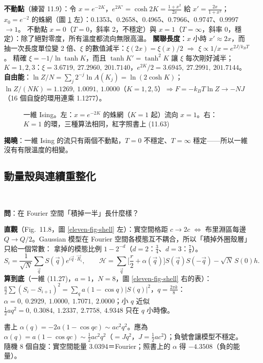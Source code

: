 \textbf{不動點}（練習 11.9）：令 $x=e^{-2K}$，$e^{2K'}=\cosh2K=\frac{1+x^2}{2x}$ 給 $x'=\frac{2x}{1+x^2}$；$x_0=e^{-2}$ 的蛛網（圖 \ref{eleven-fig-ising} 左）：0.1353、0.2658、0.4965、0.7966、0.9747、0.9997 $\to1$。
不動點 $x=0$（$T=0$，斜率 2，不穩定）與 $x=1$（$T=\infty$，斜率 0，穩定）：除了絕對零度，所有溫度都流向無限高溫。
\textbf{關聯長度}：$x$ 小時 $x'\approx2x$，而抽一次長度單位變 2 倍、$\xi$ 的數值減半：$\xi(2x)=\xi(x)/2$ $\Rightarrow$ $\xi\propto1/x=e^{2J/k_BT}$。
精確 $\xi=-1/\ln\tanh K$，而且 $\tanh K'=\tanh^2K$ 讓 $\xi$ 每次剛好減半；$K=1,2,3$：$\xi=3.6719,\ 27.2960,\ 201.7140$，$e^{2K}/2=3.6945,\ 27.2991,\ 201.7144$。
\textbf{自由能}：$\ln Z/N=\sum_j2^{-j}\ln A(K_j)=\ln(2\cosh K)$；$\ln Z/(NK)=1.1269,\ 1.0091,\ 1.0000$（$K=1,2,5$）$\Rightarrow F=-k_BT\ln Z\to-NJ$（16 個自旋的環用連乘 1.1277）。

\begin{figure}[htbp]
\centering
\begin{minipage}[c]{0.44\linewidth}\centering\ElevenFigXmap\end{minipage}\hfill
\begin{minipage}[c]{0.54\linewidth}\centering\footnotesize\setlength{\tabcolsep}{3.5pt}\ElevenTabIsing\end{minipage}
\caption{一維 Ising。左：$x=e^{-2K}$ 的蛛網（$K=1$ 起）流向 $x=1$。右：$K=1$ 的環，三種算法相同，紅字照書上 (11.63)}\label{eleven-fig-ising}
\end{figure}

\textbf{揭曉}：一維 Ising 的流只有兩個不動點，$T=0$ 不穩定、$T=\infty$ 穩定——所以一維沒有有限溫度的相變。

\subsection{動量殼與連續重整化}
\leavevmode{}\ \par\nopagebreak

\textbf{問}：在 Fourier 空間「積掉一半」長什麼樣？

\textbf{直觀}（Fig.~11.8，圖 \ref{eleven-fig-shell} 左）：實空間格距 $c\to2c$ $\Leftrightarrow$ 布里淵區每邊 $Q\to Q/2$。Gaussian 模型在 Fourier 空間各模態互不耦合，所以「積掉外圈殼層」只給一個常數：
拿掉的模態比例 $1-2^{-d}$（$d=2$：$\frac34$、$d=3$：$\frac78$）。
\[S_i=\frac1{\sqrt N}\sum_{\vec q}S(\vec q)e^{i\vec q\cdot\vec R_i},\qquad\mathcal H=\sum_{\vec q}\Big[\frac r2+\alpha(\vec q)\Big]S(\vec q)S(-\vec q)-\sqrt N\,S(0)h.\tag{11.64--11.66}\]
\textbf{算到底}（一維 (11.27)，$a=1$，$N=8$，圖 \ref{eleven-fig-shell} 右的表）：$\frac a2\sum(S_i-S_{i+1})^2=\sum_qa(1-\cos q)|S(q)|^2$，$q=\frac{2\pi k}8$：
$\alpha=0,\ 0.2929,\ 1.0000,\ 1.7071,\ 2.0000$；小 $q$ 近似 $\frac12aq^2=0,\ 0.3084,\ 1.2337,\ 2.7758,\ 4.9348$ 只在 $q$ 小時像。
\begin{errbox}[p.~273，(11.66)(11.67)]
書上 $\alpha(q)=-2a(1-\cos qc)\sim ac^2q^2$。應為 $\alpha(q)=a(1-\cos qc)\sim\frac12ac^2q^2$（$=Jq^2$，$J=\frac12ac^2$）；負號會讓模型不穩定。
隨機 8 個自旋：實空間能量 3.0394＝Fourier；照書上的 $\alpha$ 得 $-4.3508$（負的能量）。
\end{errbox}

